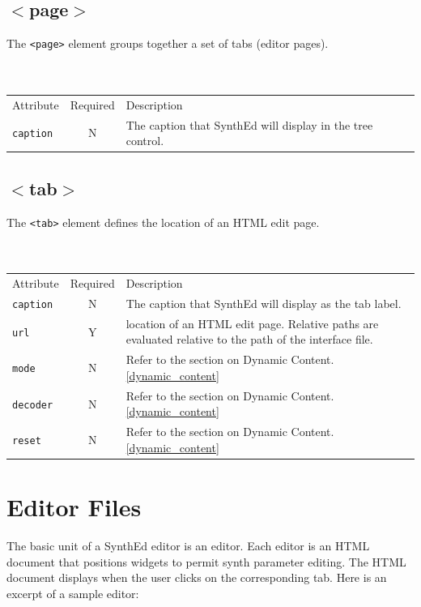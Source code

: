\documentclass[a4paper,twoside,12pt]{article}
\newcommand{\code}[1]{\color{red}\texttt{#1}\color{black}}
\begin{document}
\subsection{$<$page$>$} The \code{<page>}{} element groups
together a set of tabs (editor pages).
\\
\\
\\
\begin{tabular}{|l|c|p{9cm}|}
\hline
Attribute & Required & Description \\
\code{caption} & N & The caption that SynthEd will display in
the tree control. \\
\hline
\end{tabular}

\subsection{$<$tab$>$}
The \code{<tab>}{} element defines the location of an HTML edit
page.
\\
\\
\\
\begin{tabular}{|l|c|p{9cm}|}
\hline
Attribute & Required & Description \\
\code{caption} & N & The caption that SynthEd will display as
the tab label. \\
\code{url} & Y & location of an HTML edit page.  Relative paths
are evaluated relative
to the path of the interface file. \\
\code{mode} & N & Refer to the section on Dynamic
Content. \ref{dynamic_content} \\
\code{decoder} & N & Refer to the section on
Dynamic Content. \ref{dynamic_content} \\
\code{reset} & N & Refer to the section on
Dynamic Content. \ref{dynamic_content} \\
\hline
\end{tabular}

\section{Editor Files}\label{edit_files}
The basic unit of a SynthEd editor is an editor. Each editor is an
HTML document that positions widgets to permit synth parameter
editing. The HTML document displays when the user clicks on the
corresponding tab. Here is an excerpt of a sample editor:
\end{document}
